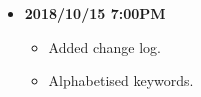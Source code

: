 \documentclass[../gazprea.tex]{subfiles}
\begin{document}
\begin{itemize}
  \item
    \textbf{2018/10/15 7:00PM}
    \begin{itemize}
      \item Added change log.
      \item Alphabetised keywords.
    \end{itemize}
\end{itemize}
\end{document}
